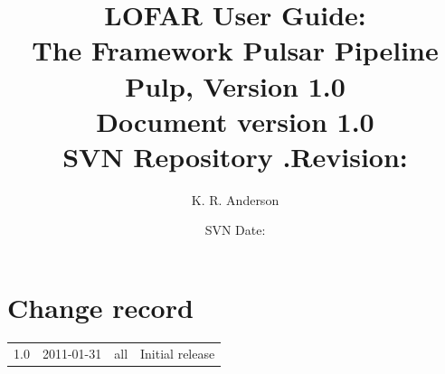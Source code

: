 \documentclass[a4paper,10pt,bibtotoc]{scrartcl}
\begin{document}

\title{LOFAR User Guide: \\ The Framework Pulsar Pipeline\\
{\large Pulp, Version 1.0} \\ 
{\normalsize Document version 1.0} \\
{\normalsize SVN Repository .Revision: \svnInfoRevision}}
\author{K. R. Anderson}
\date{\small{SVN Date: \svnInfoDate}}
\maketitle

\tableofcontents

\clearpage


\section*{Change record}

\begin{center}
  \tablelasttail{\hline}
  \begin{supertabular}{lllp{10cm}}
    1.0 & 2011-01-31 & all & Initial release \\
  \end{supertabular}
\end{center}
\clearpage

\end{document}
